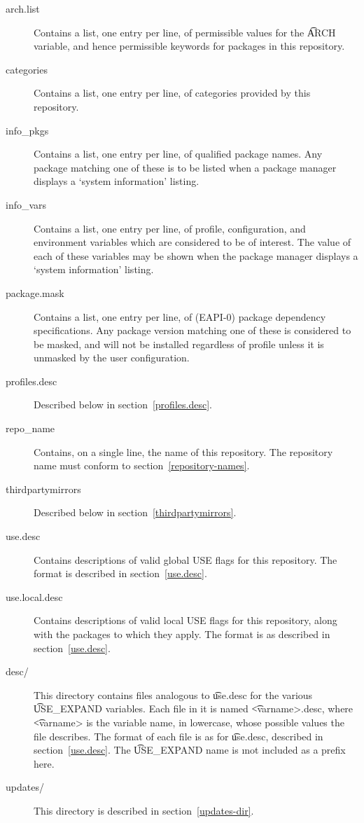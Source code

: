 \begin{description}
\item[arch.list] \label{arch.list} Contains a list, one entry per line, of permissible values for
    the \t{ARCH} variable, and hence permissible keywords for packages in this repository.
\item[categories] \label{profiles-categories} Contains a list, one entry per line, of categories
    provided by this repository.
\item[info\_pkgs] Contains a list, one entry per line, of qualified package names. Any package
    matching one of these is to be listed when a package manager displays a `system information'
    listing.
\item[info\_vars] Contains a list, one entry per line, of profile, configuration, and environment
    variables which are considered to be of interest. The value of each of these variables may be
    shown when the package manager displays a `system information' listing.
\item[package.mask] \label{profiles-package.mask}
    Contains a list, one entry per line, of (EAPI-0) package dependency specifications. Any package
    version matching one of these is considered to be masked, and will not be installed regardless
    of profile unless it is unmasked by the user configuration.
\item[profiles.desc] Described below in section~\ref{profiles.desc}.
\item[repo\_name] Contains, on a single line, the name of this repository. The repository name must
    conform to section~\ref{repository-names}.
\item[thirdpartymirrors] Described below in section~\ref{thirdpartymirrors}.
\item[use.desc] Contains descriptions of valid global USE flags for this repository. The format is
    described in section~\ref{use.desc}.
\item[use.local.desc] Contains descriptions of valid local USE flags for this repository, along with
    the packages to which they apply. The format is as described in section~\ref{use.desc}.
\item[desc/] This directory contains files analogous to \t{use.desc} for the various \t{USE\_EXPAND}
    variables. Each file in it is named \t{<varname>.desc}, where \t{<varname>} is the variable
    name, in lowercase, whose possible values the file describes. The format of each file is as for
    \t{use.desc}, described in section~\ref{use.desc}. The \t{USE\_EXPAND} name is \i{not}
    included as a prefix here.
\item[updates/] This directory is described in section~\ref{updates-dir}.
\end{description}

